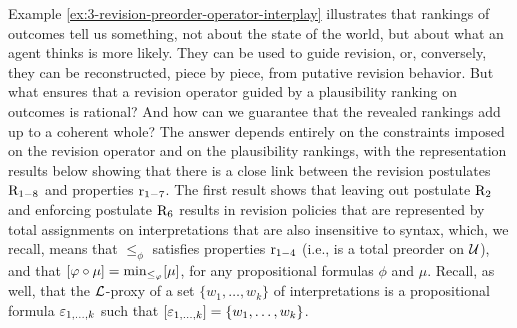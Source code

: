 Example \ref{ex:3-revision-preorder-operator-interplay} illustrates
that rankings of outcomes tell us something,
not about the state of the world,
but about what an agent thinks is more likely.
They can be used to guide revision,
or, conversely, they can be reconstructed, piece by piece,
from putative revision behavior.
But what ensures that a revision operator guided by a plausibility
ranking on outcomes is rational?
And how can we guarantee that the revealed rankings add up to 
a coherent whole?
The answer depends entirely on the constraints imposed on the revision 
operator and on the plausibility rankings,
with the representation results below showing that there is 
a close link between the revision postulates $\mathrm{R}_{1-8}$
and properties $\mathrm{r}_{1-7}$.
The first result shows that leaving out postulate $\mathrm{R}_{2}$
and enforcing postulate $\mathrm{R}_{6}$
results in revision policies that are represented 
by total assignments on interpretations that are also insensitive to syntax,
which, we recall, means that $\le_\phi$ satisfies properties $\mathrm{r}_{1-4}$
(i.e., is a total preorder on $\mathcal{U}$),
and that
$[\varphi\circ\mu]={\operatorname{min}}_{\le_\varphi}[\mu]$,
for any propositional formulas $\phi$ and $\mu$.
Recall, as well, that the $\mathcal{L}$-proxy of a set $\{w_1,\dots,w_k\}$ of interpretations
is a propositional formula $\varepsilon_{1,\dots,k}$ such that 
$[\varepsilon_{1,\dots,k}]=\{w_1,\dots,w_k\}$.

